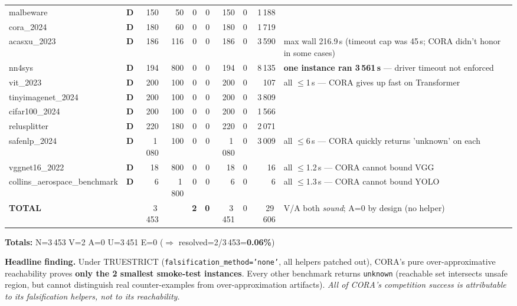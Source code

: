 \documentclass[10pt]{beamer}
\newcommand{\sdone}{{\color{cdone}\textbf{D}}}
\begin{document}
\begin{frame}[fragile]
\begin{tabular}{l c r r r r r r r l}
malbeware                       & \sdone  & 150  & 50   & 0    & 0   & 150 & 0   & 1\,188  & \\
cora\_2024                      & \sdone  & 180  & 60   & 0    & 0   & 180 & 0   & 1\,719  & \\
acasxu\_2023                    & \sdone  & 186  & 116  & 0    & 0   & 186 & 0   & 3\,590  & max wall 216.9\,s (timeout cap was 45\,s; CORA didn't honor in some cases) \\
nn4sys                          & \sdone  & 194  & 800  & 0    & 0   & 194 & 0   & 8\,135  & \textbf{one instance ran 3\,561\,s} — driver timeout not enforced \\
vit\_2023                       & \sdone  & 200  & 100  & 0    & 0   & 200 & 0   & 107     & all $\le$1\,s — CORA gives up fast on Transformer \\
tinyimagenet\_2024              & \sdone  & 200  & 100  & 0    & 0   & 200 & 0   & 3\,809  & \\
cifar100\_2024                  & \sdone  & 200  & 100  & 0    & 0   & 200 & 0   & 1\,566  & \\
relusplitter                    & \sdone  & 220  & 180  & 0    & 0   & 220 & 0   & 2\,071  & \\
safenlp\_2024                   & \sdone  & 1\,080 & 100 & 0  & 0   & 1\,080 & 0 & 3\,009  & all $\le$6\,s — CORA quickly returns 'unknown' on each \\
vggnet16\_2022                  & \sdone  & 18   & 800  & 0    & 0   & 18  & 0   & 16      & all $\le$1.2\,s — CORA cannot bound VGG \\
collins\_aerospace\_benchmark   & \sdone  & 6    & 1\,800 & 0  & 0   & 6   & 0   & 6       & all $\le$1.3\,s — CORA cannot bound YOLO \\
\midrule
\textbf{TOTAL}                  &         & 3\,453 &      & \textbf{2} & \textbf{0} & 3\,451 & 0 & 29\,606 & V/A both \emph{sound}; A=0 by design (no helper) \\
\bottomrule
\end{tabular}

\vspace{0.4em}
\centering\scriptsize
\textbf{Totals:} \quad N=3\,453 \quad V=2 \quad A=0 \quad U=3\,451 \quad E=0 \quad ($\Rightarrow$ resolved=2/3\,453=\textbf{0.06\%})

\vspace{0.2em}
\centering\scriptsize
\textbf{Headline finding.}\;
Under TRUESTRICT (\texttt{falsification\_method='none'}, all helpers patched out),
CORA's pure over-approximative reachability proves \textbf{only the 2 smallest smoke-test instances}.
Every other benchmark returns \texttt{unknown} (reachable set intersects unsafe region, but cannot
distinguish real counter-examples from over-approximation artifacts). \emph{All of CORA's
competition success is attributable to its falsification helpers, not to its reachability.}


\end{frame}
\end{document}
